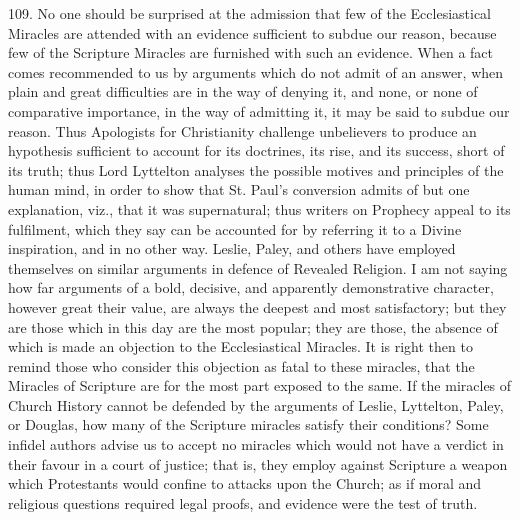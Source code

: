 109.
No one should be surprised at the admission that few of the
Ecclesiastical Miracles are attended with an evidence sufficient to
subdue our reason, because few of the Scripture Miracles are furnished
with such an evidence. When a fact comes recommended to us by
arguments which do not admit of an answer, when plain and great
difficulties are in the way of denying it, and none, or none of
comparative importance, in the way of admitting it, it may be said to
subdue our reason. Thus Apologists for Christianity challenge
unbelievers to produce an hypothesis sufficient to account for its
doctrines, its rise, and its success, short of its truth; thus Lord
Lyttelton analyses the possible motives and principles of the human
mind, in order to show that St. Paul's conversion admits of but
one explanation, viz., that it was supernatural; thus writers on
Prophecy appeal to its fulfilment, which they say can be accounted for
by referring it to a Divine inspiration, and in no other way. Leslie,
Paley, and others have employed themselves on similar arguments in
defence of Revealed Religion. I am not saying how far arguments of a
bold, decisive, and apparently demonstrative character, however great
their value, are always the deepest and most satisfactory; but they
are those which in this day are the most popular; they are those, the
absence of which is made an objection to the Ecclesiastical Miracles.
It is right then to remind those who consider this objection as fatal
to these miracles, that the Miracles of Scripture are for the most
part exposed to the same. If the miracles of Church History cannot be
defended by the arguments of Leslie, Lyttelton, Paley, or Douglas, how
many of the Scripture miracles satisfy their conditions? Some infidel
authors advise us to accept no miracles which would not have a verdict
in their favour in a court of justice; that is, they employ against
Scripture a weapon which Protestants would confine to attacks upon the
Church; as if moral and religious questions required legal proofs, and
evidence were the test of truth.

